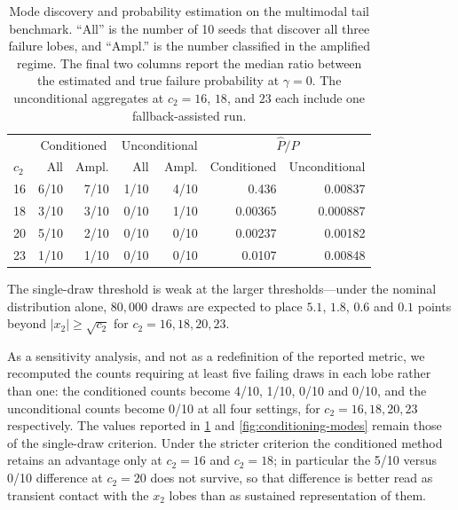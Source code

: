 \begin{table}[ht!]
    \centering
    \caption{
    Mode discovery and probability estimation on the multimodal tail benchmark. ``All'' is the number of 10 seeds that discover all three failure lobes, and ``Ampl.'' is the number classified in the amplified regime. The final two columns report the median ratio between the estimated and true failure probability at $\gamma=0$. The unconditional aggregates at $c_2=16$, $18$, and $23$ each include one fallback-assisted run.
    }
    \label{tab:tail-benchmark-results}
    \begin{tabular}{@{}lrrrrrr@{}}
        \toprule
        & \multicolumn{2}{c}{Conditioned}
        & \multicolumn{2}{c}{Unconditional}
        & \multicolumn{2}{c}{$\widehat P/P$} \\
        $c_2$
        & All & Ampl.
        & All & Ampl.
        & Conditioned & Unconditional \\
        \midrule
        16 & 6/10 & 7/10 & 1/10 & 4/10 & 0.436  & 0.00837 \\
        18 & 3/10 & 3/10 & 0/10 & 1/10 & 0.00365 & 0.000887 \\
        20 & 5/10 & 2/10 & 0/10 & 0/10 & 0.00237 & 0.00182 \\
        23 & 1/10 & 1/10 & 0/10 & 0/10 & 0.0107  & 0.00848 \\
        \bottomrule
    \end{tabular}
\end{table}

The single-draw threshold is weak at the larger thresholds---under the nominal distribution alone, $80{,}000$ draws are expected to place $5.1$, $1.8$, $0.6$ and $0.1$ points beyond $|x_2|\geq\sqrt{c_2}$ for $c_2=16,18,20,23$. 

As a sensitivity analysis, and not as a redefinition of the reported metric, we recomputed the counts requiring at least five failing draws in each lobe rather than one: the conditioned counts become 4/10, 1/10, 0/10 and 0/10, and the unconditional counts become 0/10 at all four settings, for $c_2=16,18,20,23$ respectively. The values reported in \cref{tab:tail-benchmark-results} and \cref{fig:conditioning-modes} remain those of the single-draw criterion. Under the stricter criterion the conditioned method retains an advantage only at $c_2=16$ and $c_2=18$; in particular the 5/10 versus 0/10 difference at $c_2=20$ does not survive, so that difference is better read as transient contact with the $x_2$ lobes than as sustained representation of them.


